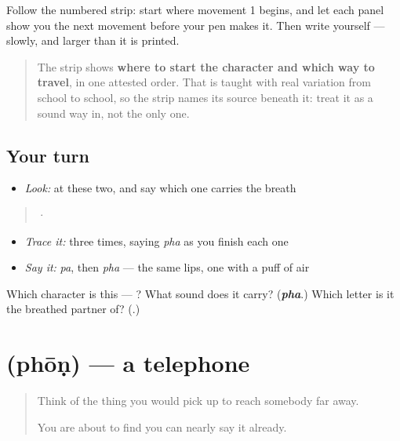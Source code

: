 Follow the numbered strip: start where movement 1 begins, and let each panel show you the next movement before your pen makes it. Then write  yourself — slowly, and larger than it is printed.

\begin{quote}
The strip shows \textbf{where to start the character and which way to travel}, in one attested order. That is taught with real variation from school to school, so the strip names its source beneath it: treat it as a sound way in, not the only one.
\end{quote}

\subsection*{Your turn}
\begin{itemize}
\raggedright
  \item \emph{Look:} at these two, and say which one carries the breath
\end{itemize}

\begin{quote}
  ·  
\end{quote}

\begin{itemize}
\raggedright
  \item \emph{Trace it:}  three times, saying \emph{pha} as you finish each one
  \item \emph{Say it:} \emph{pa}, then \emph{pha} — the same lips, one with a puff of air
\end{itemize}

\begin{tcolorbox}[breakable,colback=teal!4,colframe=teal!35!black,title={Before you move on}]
Which character is this — ? What sound does it carry? (\emph{\textbf{pha}}.) Which letter is it the breathed partner of? (\textbf{}.)
\end{tcolorbox}
\section[\texorpdfstring{\ml{ഫോൺ} (phōṇ)}{ഫോൺ (phōṇ)}]{ (phōṇ) — a telephone}

\label{lesson:ML-C110-phon}



\begin{quote}
Think of the thing you would pick up to reach somebody far away.

You are about to find you can nearly say it already.
\end{quote}

